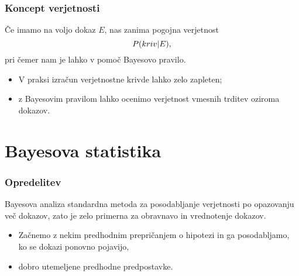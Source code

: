 \documentclass{beamer}
\begin{document}
\begin{frame}
   \frametitle{Koncept verjetnosti}
   Če imamo na voljo dokaz $E$, nas zanima pogojna verjetnost
   \[
       P(kriv \lvert E), \vspace{2mm}
   \]
   pri čemer nam je lahko v pomoč Bayesovo pravilo. \vspace{3mm}
   \begin{itemize}
      \item V praksi izračun verjetnostne krivde lahko zelo zapleten;
      \item z Bayesovim pravilom lahko ocenimo verjetnost vmesnih trditev oziroma dokazov.
   \end{itemize}
\end{frame}

\section{Bayesova statistika}

\begin{frame}
   \frametitle{Opredelitev}
   \begin{beamerboxesrounded}[]{Bayesova analiza}
      standardna metoda za posodabljanje verjetnosti po opazovanju več dokazov, zato je zelo primerna za obravnavo in vrednotenje 
      dokazov.
   \end{beamerboxesrounded} \vspace{3mm}
   \begin{itemize}
      \item Začnemo z nekim predhodnim prepričanjem o hipotezi in ga posodabljamo, ko se dokazi ponovno pojavijo,
      \item dobro utemeljene predhodne predpostavke.
   \end{itemize}
\end{frame}
\end{document}

